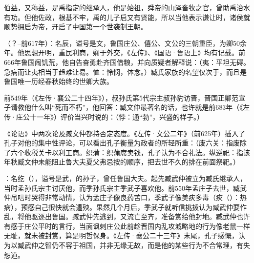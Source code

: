 伯益，又称益，是禹指定的继承人，他是始祖，舜帝的山泽畜牧之官，曾助禹治水有功。但他佐政，根基不牢，禹的儿子启又有贤能，所以当他表示谦让时，诸侯就顺势拥启为帝，开启了中国第一个世袭制王朝。

（？--前617年）：名辰，谥号是文，鲁国庄公、僖公、文公的三朝重臣，为卿50余年。他思想开明，重民利商，娴于外交，《左传》、《国语·鲁语上》均有记载。前666年鲁国闹饥荒，他自告奋勇赴齐国借粮，并向质疑者解释说：（夷：平坦无碍。急病而让夷相当于趋难让易。恤：怜悯，体念。）臧氏家族的名望仅次于，而且是鲁国唯一历经春秋始终的世卿大族。

前549年（《左传·襄公二十四年》），叔孙氏第5代宗主叔孙豹访晋，晋国正卿范宣子请教他什么叫“死而不朽”，他回答：臧文仲最著名的话，也许就是前683年（《左传·庄公十一年》）评价当兴时说的：（悖：通“勃”，兴盛的样子。）

《论语》中两次论及臧文仲都持否定态度。《左传·文公二年》（前625年）插入了孔子对他的集中性评论，可以看出孔子衡量为政者的所轻所重：（废六关：指废除了六个收税关卡以利工商。织蒲：织蒲席卖钱，孔子认为不合礼法。纵逆祀：指该年秋臧文仲未能阻止鲁大夫夏父弗忌按的顺序，把去世不久的排在前面祭祀。）

：名纥（），谥号是武，的孙子，曾任鲁国大夫。起先臧武仲被立为臧氏继承人，当时孟孙氏宗主讨厌他，而季孙氏宗主季武子喜欢他。前550年孟庄子去世，臧武仲吊唁时哭得非常动情，认为孟庄子像良药苦口，季武子像美疢多毒（疢（）：热病），预感自己很快就会遭殃。果然几个月后，季武子就听信挑拨认为臧武仲要作乱，将他驱逐出鲁国。臧武仲先逃到，又流亡至齐，准备赏给他封地。臧武仲也许有感于庄公平时的言行，当面讽刺庄公此前趁晋国内乱攻城略地的行为像老鼠一样无耻，就未被封赏，算是明哲保身。《左传·襄公二十三年》末尾，孔子感慨，认为以臧武仲之智仍不容于祖国，并非无缘无故，而是他的某些行为不合常理，有失恕道。

